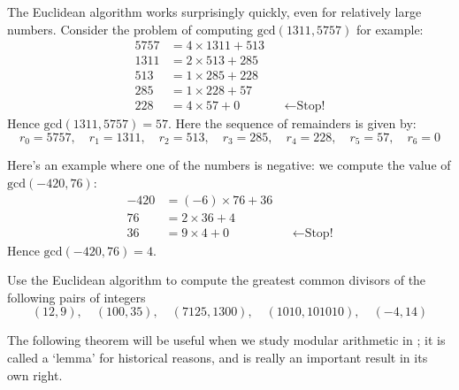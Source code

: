 \begin{example} \label{exGCD13115757}
The Euclidean algorithm works surprisingly quickly, even for relatively large numbers. Consider the problem of computing $\mathrm{gcd}(1311, 5757)$ for example:
\begin{align*}
5757 &= 4 \times 1311 + 513 && \\
1311 &= 2 \times 513 + 285 && \\
513 &= 1 \times 285 + 228 && \\
285 &= 1 \times 228 + 57 && \\
228 &= 4 \times \boxed{57} + 0 && \leftarrow \text{Stop!}
\end{align*}
Hence $\mathrm{gcd}(1311,5757) = 57$. Here the sequence of remainders is given by:
\[ r_0=5757, \quad r_1 = 1311, \quad r_2 = 513, \quad r_3 = 285, \quad r_4 = 228, \quad r_5 = 57, \quad r_6 = 0 \]
\end{example}

\begin{example}
Here's an example where one of the numbers is negative: we compute the value of $\mathrm{gcd}(-420, 76)$:
\begin{align*}
-420 &= (-6) \times 76 + 36 && \\
76 &= 2 \times 36 + 4 && \\
36 &= 9 \times \boxed{4} + 0 && \leftarrow \text{Stop!}
\end{align*}
Hence $\mathrm{gcd}(-420, 76) = 4$.
\end{example}

\begin{example}
\label{exGCDsofPairs}
Use the Euclidean algorithm to compute the greatest common divisors of the following pairs of integers
\[ (12, 9), \quad (100, 35), \quad (7125, 1300), \quad (1010, 101010), \quad (-4, 14) \]
\end{example}

The following theorem will be useful when we study modular arithmetic in ; it is called a `lemma' for historical reasons, and is really an important result in its own right.

